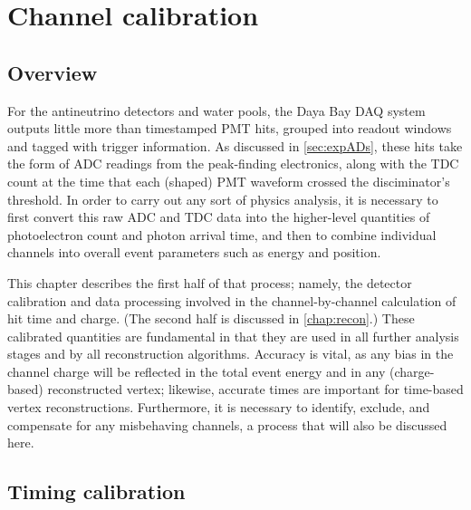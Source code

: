 \documentclass[../thesis.tex]{subfiles}
\begin{document}
\chapter{Channel calibration}
\label{chap:calib}

\begin{comment}
  Add channel quality to this chapter!
\end{comment}

\section{Overview}

For the antineutrino detectors and water pools, the Daya Bay DAQ system outputs little more than timestamped PMT hits, grouped into readout windows and tagged with trigger information. As discussed in \autoref{sec:expADs}, these hits take the form of ADC readings from the peak-finding electronics, along with the TDC count at the time that each (shaped) PMT waveform crossed the disciminator's threshold. In order to carry out any sort of physics analysis, it is necessary to first convert this raw ADC and TDC data into the higher-level quantities of photoelectron count and photon arrival time, and then to combine individual channels into overall event parameters such as energy and position.

This chapter describes the first half of that process; namely, the detector calibration and data processing involved in the channel-by-channel calculation of hit time and charge. (The second half is discussed in \autoref{chap:recon}.) These calibrated quantities are fundamental in that they are used in all further analysis stages and by all reconstruction algorithms. Accuracy is vital, as any bias in the channel charge will be reflected in the total event energy and in any (charge-based) reconstructed vertex; likewise, accurate times are important for time-based vertex reconstructions. Furthermore, it is necessary to identify, exclude, and compensate for any misbehaving channels, a process that will also be discussed here.

\section{Timing calibration}
\end{document}
